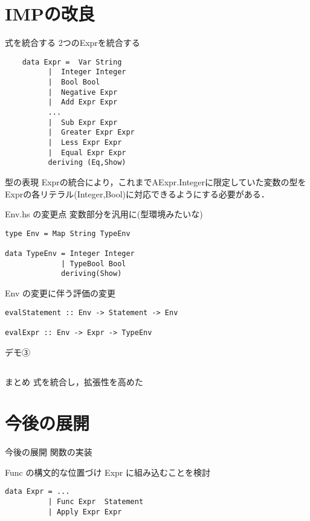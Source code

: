 \documentclass[uplatex,dvipdfmx,ja=standard]{beamer}
\begin{document}
\section{IMPの改良}

\begin{frame}[fragile]{式を統合する}
    2つのExprを統合する
    \begin{verbatim}
    data Expr =  Var String   
          |  Integer Integer 
          |  Bool Bool
          |  Negative Expr
          |  Add Expr Expr
          ...
          |  Sub Expr Expr
          |  Greater Expr Expr
          |  Less Expr Expr
          |  Equal Expr Expr
          deriving (Eq,Show)
    \end{verbatim}

\end{frame}

\begin{frame}[fragile]{型の表現}
    Exprの統合により，これまでAExpr.Integerに限定していた変数の型をExprの各リテラル(Integer,Bool)に対応できるようにする必要がある．

\end{frame}

\begin{frame}[fragile]{Env.hs の変更点}
    変数部分を汎用に(型環境みたいな)
    \begin{verbatim}
type Env = Map String TypeEnv  

data TypeEnv = Integer Integer 
             | TypeBool Bool
             deriving(Show)
    \end{verbatim}
\end{frame}

\begin{frame}[fragile]{Env の変更に伴う評価の変更}
    
    \begin{verbatim}
evalStatement :: Env -> Statement -> Env 

evalExpr :: Env -> Expr -> TypeEnv
    \end{verbatim}
\end{frame}

\begin{frame}[fragile]{デモ③}
\end{frame}

\subsection{}

\begin{frame}{まとめ}
    式を統合し，拡張性を高めた
\end{frame}


\section{今後の展開}
\begin{frame}{今後の展開}
    関数の実装
\end{frame}

\begin{frame}[fragile]{Func の構文的な位置づけ}
    Expr に組み込むことを検討
    \begin{verbatim}
data Expr = ...
          | Func Expr  Statement
          | Apply Expr Expr
    \end{verbatim}
\end{frame}

%
\end{document}
